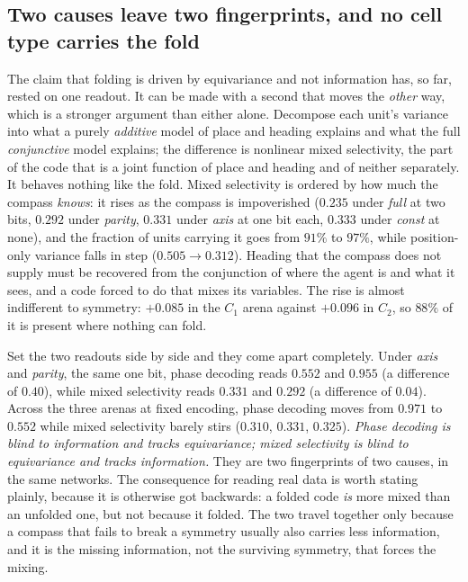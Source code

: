 \documentclass[9pt,lineno]{elife}
\begin{document}
\subsection{Two causes leave two fingerprints, and no cell type carries the fold}

The claim that folding is driven by equivariance and not information has, so far, rested on one readout.
It can be made with a second that moves the \emph{other} way, which is a stronger argument than either
alone. Decompose each unit's variance into what a purely \emph{additive} model of place and heading
explains and what the full \emph{conjunctive} model explains; the difference is nonlinear mixed
selectivity, the part of the code that is a joint function of place and heading and of neither
separately. It behaves nothing like the fold. Mixed selectivity is ordered by how much the compass
\emph{knows}: it rises as the compass is impoverished ($0.235$ under \textit{full} at two bits,
$0.292$ under \textit{parity}, $0.331$ under \textit{axis} at one bit each, $0.333$ under \textit{const}
at none), and the fraction of units carrying it goes from $91\%$ to $97\%$, while position-only variance
falls in step ($0.505 \to 0.312$). Heading that the compass does not supply must be recovered from
the conjunction of where the agent is and what it sees, and a code forced to do that mixes its variables.
The rise is almost indifferent to symmetry: $+0.085$ in the $C_1$ arena against $+0.096$ in
$C_2$, so $88\%$ of it is present where nothing can fold.

Set the two readouts side by side and they come apart completely. Under \textit{axis} and
\textit{parity}, the same one bit, phase decoding reads $0.552$ and $0.955$ (a difference of
$0.40$), while mixed selectivity reads $0.331$ and $0.292$ (a difference of $0.04$). Across the three
arenas at fixed encoding, phase decoding moves from $0.971$ to $0.552$ while mixed selectivity barely
stirs ($0.310$, $0.331$, $0.325$). \emph{Phase decoding is blind to information and tracks equivariance;
mixed selectivity is blind to equivariance and tracks information.} They are two fingerprints of two
causes, in the same networks. The consequence for reading real data is worth stating plainly, because it
is otherwise got backwards: a folded code \emph{is} more mixed than an unfolded one, but not because it
folded. The two travel together only because a compass that fails to break a symmetry usually also
carries less information, and it is the missing information, not the surviving symmetry, that forces the
mixing.
\end{document}
